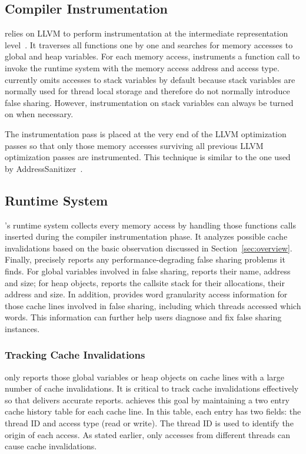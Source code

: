 \subsection{Compiler Instrumentation}
\label{sec:compiler}

\Predator{} relies on LLVM to perform instrumentation at the intermediate representation level~\cite{llvm}.
It traverses all functions one by one and searches for memory accesses
to global and heap variables.  For each memory access, \Predator{}
instruments a function call to invoke the runtime system with the
memory access address and access type. \Predator{} currently omits
accesses to stack variables by default because stack variables are
normally used for thread local storage and therefore do not normally
introduce false sharing. However, instrumentation on stack variables
can always be turned on when necessary.

The instrumentation pass is placed at the very end of the LLVM
optimization passes so that only those memory accesses surviving all
previous LLVM optimization passes are instrumented.  This technique is
similar to the one used by AddressSanitizer~\cite{Addresssanitizer}.

\subsection{Runtime System}
\label{sec:runtime}

\Predator{}'s runtime system collects every memory access by handling 
those functions calls inserted during the compiler instrumentation
phase. It analyzes possible cache invalidations based on the basic
observation discussed in Section~\ref{sec:overview}.
Finally, \Predator{} precisely reports any performance-degrading false
sharing problems it finds.  For global variables involved in false
sharing, \Predator{} reports their name, address and size; for heap
objects, \Predator{} reports the callsite stack for their allocations,
their address and size.  In addition, \Predator{} provides word
granularity access information for those cache lines involved in false
sharing, including which threads accessed which words.  This
information can further help users diagnose and fix false sharing
instances.

\subsubsection{Tracking Cache Invalidations}
\Predator{} only reports those global variables or heap objects on 
cache lines with a large number of cache invalidations. 
It is critical to track cache invalidations effectively so that \Predator{} delivers accurate reports.
\Predator{} achieves this goal by maintaining a  
two entry cache history table for each cache line.  In this table,
each entry has two fields: the thread ID and access type (read or write).
The thread ID is used to identify the origin of each access. As stated earlier,
only accesses from different threads can cause
cache invalidations.

